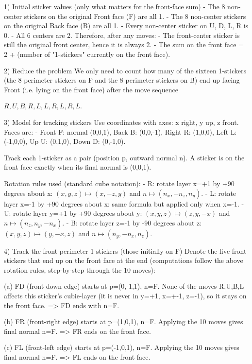 1) Initial sticker values (only what matters for the front-face sum)
- The 8 non-center stickers on the original Front face (F) are all 1.
- The 8 non-center stickers on the original Back face (B) are all 1.
- Every non-center sticker on U, D, L, R is 0.
- All 6 centers are 2.
Therefore, after any moves:
- The front-center sticker is still the original front center, hence it is always 2.
- The sum on the front face = 2 + (number of "1-stickers" currently on the front face).

2) Reduce the problem
We only need to count how many of the sixteen 1-stickers (the 8 perimeter stickers on F and the 8 perimeter stickers on B) end up facing Front (i.e. lying on the front face) after the move sequence

$R, U, B, R, L, L, R, L, R, L$.

3) Model for tracking stickers
Use coordinates with axes: x right, y up, z front. Faces are:
- Front F: normal (0,0,1), Back B: (0,0,-1), Right R: (1,0,0), Left L: (-1,0,0), Up U: (0,1,0), Down D: (0,-1,0).

Track each 1-sticker as a pair (position p, outward normal n). A sticker is on the front face exactly when its final normal is (0,0,1).

Rotation rules used (standard cube notation):
- R: rotate layer x=+1 by +90 degrees about x: $(x,y,z)\mapsto (x,-z,y)$ and $n\mapsto (n_x,-n_z,n_y)$.
- L: rotate layer x=-1 by +90 degrees about x: same formula but applied only when x=-1.
- U: rotate layer y=+1 by +90 degrees about y: $(x,y,z)\mapsto (z,y,-x)$ and $n\mapsto (n_z,n_y,-n_x)$.
- B: rotate layer z=-1 by -90 degrees about z: $(x,y,z)\mapsto (y,-x,z)$ and $n\mapsto (n_y,-n_x,n_z)$.

4) Track the front-perimeter 1-stickers (those initially on F)
Denote the five front stickers that end up on the front face at the end (computations follow the above rotation rules, step-by-step through the 10 moves):

(a) FD (front-down edge) starts at p=(0,-1,1), n=F.
None of the moves R,U,B,L affects this sticker's cubie-layer (it is never in y=+1, x=+-1, z=-1), so it stays on the front face.
=> FD ends with n=F.

(b) FR (front-right edge) starts at p=(1,0,1), n=F.
Applying the 10 moves gives final normal n=F.
=> FR ends on the front face.

(c) FL (front-left edge) starts at p=(-1,0,1), n=F.
Applying the 10 moves gives final normal n=F.
=> FL ends on the front face.

